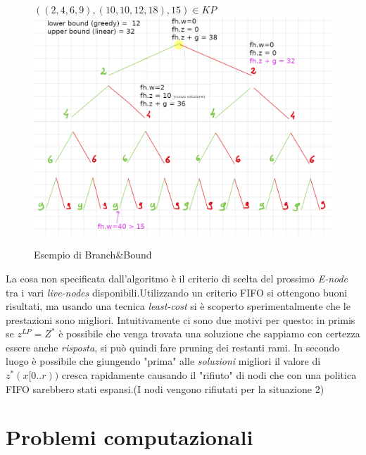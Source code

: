 \documentclass[a4paper]{article}
\begin{document}
\begin{adjustwidth}{.8cm}{0cm}
\begin{itemize}
	\end{itemize}
	\begin{figure}[!ht]
\centering
\textbf{$((2,4,6,9),(10,10,12,18),15) \in KP$}
\includegraphics[width=1\textwidth]{./img/C14_BB_manuale.png}
\caption{Esempio di Branch\&Bound} \label{FIG:C14_BB_manuale}
\end{figure}
	La cosa non specificata dall'algoritmo è il criterio di scelta del prossimo \textit{E-node} tra i vari \textit{live-nodes} disponibili.Utilizzando un criterio FIFO si ottengono buoni risultati, ma usando una tecnica \emph{least-cost} si è scoperto sperimentalmente che le prestazioni sono migliori.
	Intuitivamente ci sono due motivi per questo: in primis se $z^{LP} = Z^*$ è possibile che venga trovata una soluzione che sappiamo con certezza essere anche \textit{risposta}, si può quindi fare pruning dei restanti rami.
	In secondo luogo è possibile che giungendo "prima" alle \textit{soluzioni} migliori il valore di $z^*(x[0..r))$ cresca rapidamente causando il "rifiuto" di nodi che con una politica FIFO sarebbero stati espansi.(I nodi vengono rifiutati per la situazione 2)
\end{adjustwidth}
\section{Problemi computazionali}
\end{document}
